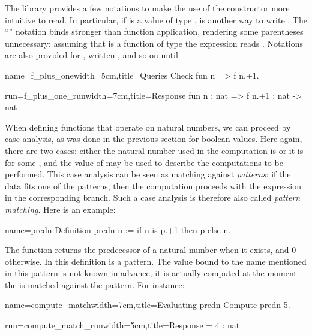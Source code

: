The \mcbMC{} library provides a few notations to make the use of the
constructor  more intuitive to read.  In particular, if 
is a value of type ,  is another way to write
.  The ``'' notation binds stronger than function
application, rendering some parentheses unnecessary:
assuming  that  is a function of type
 the expression  reads
.  Notations are also provided for , written
, and so on until .

\begin{coq-left}{name=f_plus_one}{width=5cm,title=Queries}
Check fun n => f n.+1.
\end{coq-left}
\begin{coqout-right}{run=f_plus_one_run}{width=7cm,title=Response}
fun n : nat => f n.+1 : nat -> nat
\end{coqout-right}

When defining functions that operate on natural numbers, we
can
proceed by case analysis, as was done in the previous section for boolean
values. Here again, there are two cases: either the natural number used in
the computation is  or it is  for
some , and the value of  may be used to describe the
computations to be performed. This case analysis can be seen as
matching against \emph{patterns}: if the data fits one of
the patterns, then the computation proceeds with the expression in the
corresponding branch.  Such a case analysis is therefore also called
\emph{pattern matching}. Here is an example:

\begin{coq}{name=predn}{}
Definition predn n := if n is p.+1 then p else n.
\end{coq}

The function  returns the predecessor of a natural number
when it exists, and 0 otherwise. In this definition  is a
pattern. The value bound to the name  mentioned in this pattern is not
known in advance; it is actually computed at the moment the  is matched
against the pattern. For instance:

\begin{coq-left}{name=compute_match}{width=7cm,title=Evaluating predn}
Compute predn 5.
\end{coq-left}
\begin{coqout-right}{run=compute_match_run}{width=5cm,title=Response}
= 4 : nat
\end{coqout-right}

